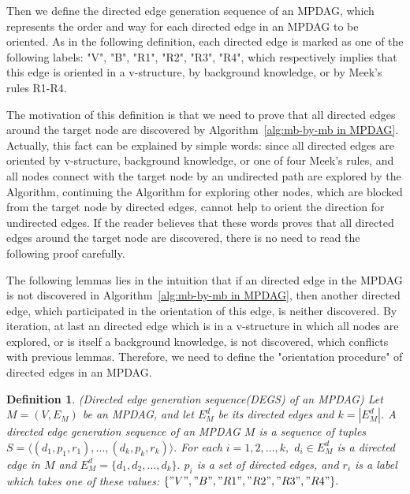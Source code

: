 \documentclass{article}
\newtheorem{definition}{Definition}
\begin{document}
Then we define the directed edge generation sequence of an MPDAG, which represents the order and way for each directed edge in an MPDAG to be oriented. As in the following definition, each directed edge is marked as one of the following labels: "V", "B", "R1", "R2", "R3", "R4", which respectively implies that this edge is oriented in a v-structure, by background knowledge, or by Meek's rules R1-R4. 

The motivation of this definition is that we need to prove that all directed edges around the target node are discovered by Algorithm~\ref{alg:mb-by-mb in MPDAG}. Actually, this fact can be explained by simple words: since all directed edges are oriented by v-structure, background knowledge, or one of four Meek's rules, and all nodes connect with the target node by an undirected path are explored by the Algorithm, continuing the Algorithm for exploring other nodes, which are blocked from the target node by directed edges, cannot help to orient the direction for undirected edges. If the reader believes that these words proves that all directed edges around the target node are discovered, there is no need to read the following proof carefully. 

The following lemmas lies in the intuition that if an directed edge in the MPDAG is not discovered in Algorithm~\ref{alg:mb-by-mb in MPDAG}, then another directed edge, which participated in the orientation of this edge, is neither discovered. By iteration, at last an directed edge which is in a v-structure in which all nodes are explored, or is itself a background knowledge, is not discovered, which conflicts with previous lemmas. Therefore, we need to define the "orientation procedure" of directed edges in an MPDAG.

\begin{definition}
(Directed edge generation sequence(DEGS) of an MPDAG) Let $M=(V,E_M)$ be an MPDAG, and let $E^d_M$ be its directed edges and $k=|E^d_M|$. A directed edge generation sequence of an MPDAG $M$ is a sequence of tuples $S=\langle(d_1,p_1,r_1),\dots,(d_k,p_k,r_k) \rangle.$ For each $i=1,2,\dots,k,$ $d_i\in E^d_M$ is a directed edge in $M$ and $E^d_M=\{d_1,d_2,\dots,d_k\}.$ $p_i$ is a set of directed edges, and $r_i$ is a label which takes one of these values: $\{"V","B","R1","R2","R3","R4"\}.$
\end{definition}
\end{document}
